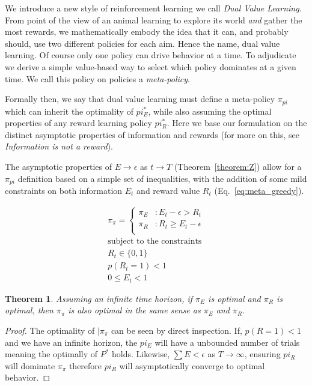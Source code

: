 \documentclass[9pt,twocolumn,twoside]{pnas-new}
\newtheorem{theorem}{Theorem}
\begin{document}
We introduce a new style of reinforcement learning we call \textit{Dual Value Learning}. From point of the view of an animal learning to explore its world \textit{and} gather the most rewards, we mathematically embody the idea that it can, and probably should, use two different policies for each aim. Hence the name, dual value learning. Of course only one policy can drive behavior at a time. To adjudicate we derive a simple value-based way %
 to select which policy dominates at a given time. We call this policy on policies a \textit{meta-policy}.

Formally then, we say that dual value learning must define a meta-policy $\pi_{pi}$ which can inherit the optimality of $pi^*_E$, while also assuming the optimal properties of any reward learning policy $pi^*_R$. Here we base our formulation on the distinct asymptotic properties of information and rewards (for more on this, see \textit{Information is not a reward}).

The asymptotic properties of $E \rightarrow \epsilon$ as $t \rightarrow T$ (Theorem~\ref{theorem:Z}) allow for a $\pi_{pi}$ definition based on a simple set of inequalities, with the addition of some mild constraints on both information $E_t$ and reward value $R_t$ (Eq.~\ref{eq:meta_greedy}). 

\begin{equation} \label{eq:meta_greedy}
    \begin{split}
        \pi_{\pi} = 
        \begin{cases}
            \pi_E & : E_t - \epsilon > R_t \\
            \pi_R & : R_t \geq E_t - \epsilon \\
        \end{cases}\\
        \text{subject to the constraints}\\
        R_t \in \{0, 1\}\\ 
        p(R_t = 1) < 1\\
        0 \leq E_t < 1
    \end{split}
\end{equation}

\begin{theorem} \label{theorem:meta}
    Assuming an infinite time horizon, if $\pi_E$ is optimal and $\pi_R$ is optimal, then $\pi_{\pi}$ is also optimal in the same sense as $\pi_E$ and $\pi_R$.
\end{theorem}
\begin{proof}
    The optimality of $|\pi_{\pi}$ can be seen by direct inspection. If, $p(R = 1) < 1$ and we have an infinite horizon, the $pi_E$ will have a unbounded number of trials meaning the optimally of $P^*$ holds. Likewise, $\sum E < \epsilon$ as $T \rightarrow \infty$, ensuring $pi_R$ will dominate $\pi_{\pi}$ therefore $pi_R$ will asymptotically converge to optimal behavior.
\end{proof}
\end{document}
